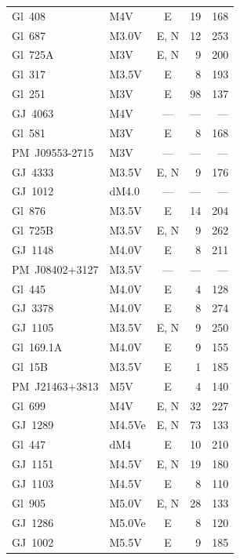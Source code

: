 \begin{table}
\begin{tabular}{l l c r r}
Gl~408         & M4V    & E    & 19  & 168 \\
Gl~687         & M3.0V  & E, N & 12  & 253 \\
Gl~725A        & M3V    & E, N & 9   & 200 \\
Gl~317         & M3.5V  & E    & 8   & 193 \\
Gl~251         & M3V    & E    & 98  & 137 \\
GJ~4063        & M4V    & ---  & --- & --- \\
Gl~581         & M3V    & E    & 8   & 168 \\
PM~J09553-2715 & M3V    & ---  & --- & --- \\
GJ~4333        & M3.5V  & E, N & 9   & 176 \\
GJ~1012        & dM4.0  & ---  & --- & --- \\
Gl~876         & M3.5V  & E    & 14  & 204 \\
Gl~725B        & M3.5V  & E, N & 9   & 262 \\
GJ~1148        & M4.0V  & E    & 8   & 211 \\
PM~J08402+3127 & M3.5V  & ---  & --- & --- \\
Gl~445         & M4.0V  & E    & 4   & 128 \\
GJ~3378        & M4.0V  & E    & 8   & 274 \\
GJ~1105        & M3.5V  & E, N & 9   & 250 \\
Gl~169.1A      & M4.0V  & E    & 9   & 155 \\
Gl~15B         & M3.5V  & E    & 1   & 185 \\
PM~J21463+3813 & M5V    & E    & 4   & 140 \\
Gl~699         & M4V    & E, N & 32  & 227 \\
GJ~1289        & M4.5Ve & E, N & 73  & 133 \\
Gl~447         & dM4    & E    & 10  & 210 \\
GJ~1151        & M4.5V  & E, N & 19  & 180 \\
GJ~1103        & M4.5V  & E    & 8   & 110 \\
Gl~905         & M5.0V  & E, N & 28  & 133 \\
GJ~1286        & M5.0Ve & E    & 8   & 120 \\
GJ~1002        & M5.5V  & E    & 9   & 185 \\
\bottomrule
\end{tabular}
\end{table}
